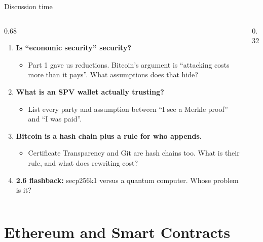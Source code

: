 \ifdefined\PRESENTATION\else\PassOptionsToClass{handout}{beamer}\fi\documentclass[aspectratio=169, lualatex]{beamer}
\begin{document}
\begin{frame}{Discussion time}
	\begin{columns}[c]
		\begin{column}{0.68\textwidth}
			\begin{enumerate}
				\item \textbf{Is ``economic security'' security?}
				      \begin{itemize}
					      \item Part 1 gave us reductions. Bitcoin's argument is ``attacking costs more than it pays''. What assumptions does that hide?
				      \end{itemize}
				\item \textbf{What is an SPV wallet actually trusting?}
				      \begin{itemize}
					      \item List every party and assumption between ``I see a Merkle proof'' and ``I was paid''.
				      \end{itemize}
				\item \textbf{Bitcoin is a hash chain plus a rule for who appends.}
				      \begin{itemize}
					      \item Certificate Transparency and Git are hash chains too. What is their rule, and what does rewriting cost?
				      \end{itemize}
				\item \textbf{2.6 flashback:} secp256k1 versus a quantum computer. Whose problem is it?
			\end{enumerate}
		\end{column}
		\begin{column}{0.32\textwidth}
		\end{column}
	\end{columns}
\end{frame}

\section{Ethereum and Smart Contracts}
\end{document}
